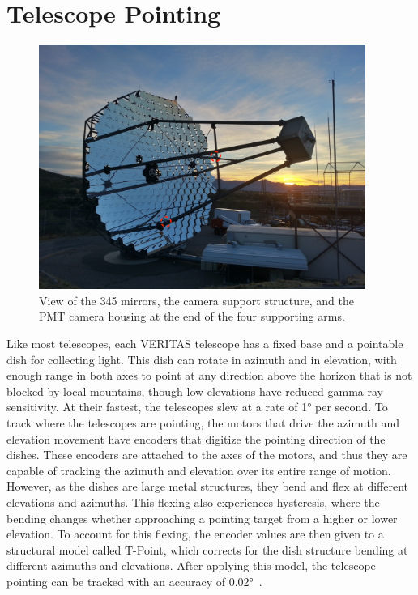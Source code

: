 \section{Telescope Pointing}\label{sec:telpoint}

\begin{figure}[ht]
  \centering
  \includegraphics[width=0.95\textwidth]{images/single_telescope}
  \caption[Single Veritas Telescope]{
    View of the 345 mirrors, the camera support structure, and the PMT camera housing at the end of the four supporting arms.}
  \label{fig:davcottel}
\end{figure}

Like most telescopes, each VERITAS telescope has a fixed base and a pointable dish for collecting light.
This dish can rotate in azimuth and in elevation, with enough range in both axes to point at any direction above the horizon that is not blocked by local mountains, though low elevations have reduced gamma-ray sensitivity.
At their fastest, the telescopes slew at a rate of \nicetilde{}\ang{1} per second.
To track where the telescopes are pointing, the motors that drive the azimuth and elevation movement have encoders that digitize the pointing direction of the dishes.
These encoders are attached to the axes of the motors, and thus they are capable of tracking the azimuth and elevation over its entire range of motion.
However, as the dishes are large metal structures, they bend and flex at different elevations and azimuths.
This flexing also experiences hysteresis, where the bending changes whether approaching a pointing target from a higher or lower elevation.
To account for this flexing, the encoder values are then given to a structural model called T-Point, which corrects for the dish structure bending at different azimuths and elevations.
After applying this model, the telescope pointing can be tracked with an accuracy of \nicetilde{}\ang{0.02}~\cite{holder2008status}.

